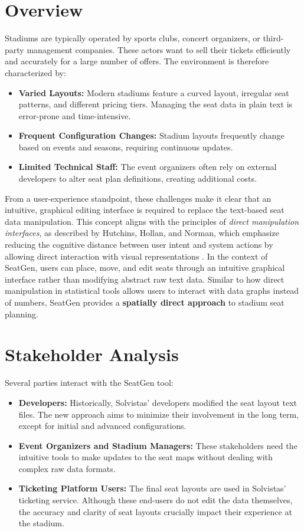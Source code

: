 \section{Overview}
Stadiums are typically operated by sports clubs, concert organizers, or third-party management companies. These actors want to sell their tickets efficiently and accurately for a large number of offers. The environment is therefore characterized by:
\begin{itemize}
    \item \textbf{Varied Layouts:} Modern stadiums feature a curved layout, irregular seat patterns, and different pricing tiers. Managing the seat data in plain text is error-prone and time-intensive.
    \item \textbf{Frequent Configuration Changes:} Stadium layouts frequently change based on events and seasons, requiring continuous updates.
    \item \textbf{Limited Technical Staff:} The event organizers often rely on external developers to alter seat plan definitions, creating additional costs.
\end{itemize}

From a user-experience standpoint, these challenges make it clear that an intuitive, graphical editing interface is required to replace the text-based seat data manipulation. This concept aligns with the principles of \emph{direct manipulation interfaces}, as described by Hutchins, Hollan, and Norman, which emphasize reducing the cognitive distance between user intent and system actions by allowing direct interaction with visual representations \cite{Hutchins01121985}. In the context of SeatGen, users can place, move, and edit seats through an intuitive graphical interface rather than modifying abstract raw text data. Similar to how direct manipulation in statistical tools allows users to interact with data graphs instead of numbers, SeatGen provides a \textbf{spatially direct approach} to stadium seat planning.

\section{Stakeholder Analysis}
Several parties interact with the SeatGen tool:
\begin{itemize}
    \item \textbf{Developers:} Historically, Solvistas' developers modified the seat layout text files. The new approach aims to minimize their involvement in the long term, except for initial and advanced configurations.
    \item \textbf{Event Organizers and Stadium Managers:} These stakeholders need the intuitive tools to make updates to the seat maps without dealing with complex raw data formats.
    \item \textbf{Ticketing Platform Users:} The final seat layouts are used in Solvistas' ticketing service. Although these end-users do not edit the data themselves, the accuracy and clarity of seat layouts crucially impact their experience at the stadium.
\end{itemize}

